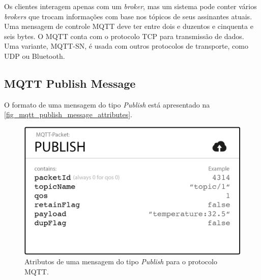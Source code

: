 Os clientes interagem apenas com um \textit{broker}, mas um sistema pode conter vários \textit{brokers} que trocam informações com base nos tópicos de seus assinantes atuais. Uma mensagem de controle MQTT deve ter entre dois e duzentos e cinquenta e seis bytes. O MQTT conta com o protocolo TCP para transmissão de dados. Uma variante, MQTT-SN, é usada com outros protocolos de transporte, como UDP ou Bluetooth.

\subsection{MQTT Publish Message}\label{subsection_mqtt_publish_message}
O formato de uma mensagem do tipo \textit{Publish} está apresentado na \autoref{fig_mqtt_publish_message_attributes}.
\begin{figure}[htb]
	\begin{center}
		\caption{Atributos de uma mensagem do tipo \textit{Publish} para o protocolo MQTT.}\label{fig_mqtt_publish_message_attributes}
		\includegraphics[scale=0.5]{Imagens/mqtt_publish_message_attributes.png}
	\end{center}
\end{figure}


